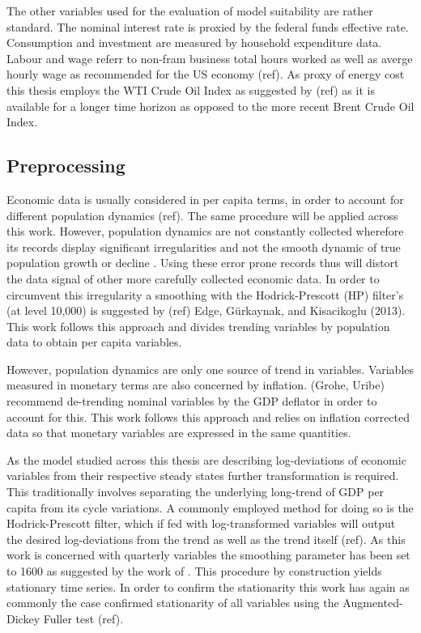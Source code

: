 \documentclass[12pt,a4paper,english]{article} %
\begin{document}
	The other variables used for the evaluation of model suitability are rather standard. The nominal interest rate is proxied by the federal funds effective rate. Consumption and investment are measured by household expenditure data. Labour and wage referr to non-fram business total hours worked as well as averge hourly wage as recommended for the US economy (ref). As proxy of energy cost this thesis employs the WTI Crude Oil Index as suggested by (ref) as it is available for a longer time horizon as opposed to the more recent Brent Crude Oil Index.
	
	\subsection{Preprocessing}
	
	Economic data is usually considered in per capita terms, in order to account for different population dynamics (ref). The same procedure will be applied across this work. However, population dynamics are not constantly collected wherefore its records display significant irregularities and not the smooth dynamic of true population growth or decline \cite{pfeifer_guide_2021}. Using these error prone records thus will distort the data signal of other more carefully collected economic data. In order to circumvent this irregularity a smoothing with the Hodrick-Prescott (HP) filter's (at level 10,000) is suggested by (ref) Edge, Gürkaynak, and Kisacikoglu (2013). This work follows this approach and divides trending variables by population data to obtain per capita variables.
	
	However, population dynamics are only one source of trend in variables. Variables measured in monetary terms are also concerned by inflation. \cite{pfeifer_guide_2021} (Grohe, Uribe) recommend de-trending nominal variables by the GDP deflator in order to account for this. This work follows this approach and relies on inflation corrected data so that monetary variables are expressed in the same quantities.
	
	As the model studied across this thesis are describing log-deviations of economic variables from their respective steady states further transformation is required. This traditionally involves separating the underlying long-trend of GDP per capita from its cycle variations. A commonly employed method for doing so is the Hodrick-Prescott filter, which if fed with log-transformed variables will output the desired log-deviations from the trend as well as the trend itself (ref). As this work is concerned with quarterly variables the smoothing parameter has been set to 1600 as suggested by the work of \cite{ravn_adjusting_2002}. This procedure by construction yields stationary time series. In order to confirm the stationarity this work has again as commonly the case confirmed stationarity of all variables using the Augmented-Dickey Fuller test (ref).
	
\end{document}
